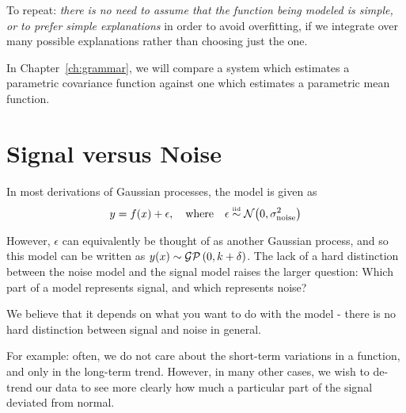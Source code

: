 To repeat: \emph{there is no need to assume that the function being modeled is simple, or to prefer simple explanations} in order to avoid overfitting, if we integrate over many possible explanations rather than choosing just the one.

In Chapter~\ref{ch:grammar}, we will compare a system which estimates a parametric covariance function against one which estimates a parametric mean function.


\section{Signal versus Noise}

In most derivations of Gaussian processes, the model is given as
%
\begin{align}
y = f(x) + \epsilon, \quad \textnormal{where} \quad \epsilon \overset{\mbox{\tiny iid}}{\sim} \mathcal{N}\!\left(0,\sigma^2_{\textnormal{noise}}\right)
\end{align}

However, $\epsilon$ can equivalently be thought of as another Gaussian process, and so this model can be written as $y(x) \sim \mathcal{GP}\left(0, k + \delta \right)$.  The lack of a hard distinction between the noise model and the signal model raises the larger question:  Which part of a model represents signal, and which represents noise?

We believe that it depends on what you want to do with the model - there is no hard distinction between signal and noise in general.

For example: often, we do not care about the short-term variations in a function, and only in the long-term trend.
However, in many other cases, we wish to de-trend our data to see more clearly how much a particular part of the signal deviated from normal.

\fi






\outbpdocument{


}

